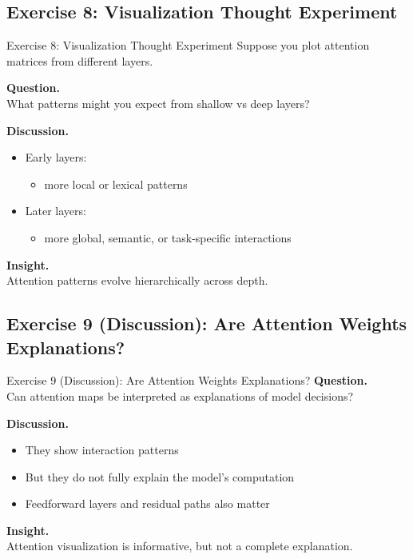 \documentclass[aspectratio=169,11pt]{beamer}
\begin{document}
\subsection{Exercise 8: Visualization Thought Experiment}
\begin{frame}[t,allowframebreaks]{Exercise 8: Visualization Thought Experiment}
\small
Suppose you plot attention matrices from different layers.

\textbf{Question.}\\ What patterns might you expect from shallow vs deep layers?

\textbf{Discussion.}\\ \begin{itemize}
    \item Early layers:
    \begin{itemize}
        \item more local or lexical patterns
    \end{itemize}

    \item Later layers:
    \begin{itemize}
        \item more global, semantic, or task-specific interactions
    \end{itemize}
\end{itemize}

\textbf{Insight.}\\ Attention patterns evolve hierarchically across depth.
\end{frame}

\subsection{Exercise 9 (Discussion): Are Attention Weights Explanations?}
\begin{frame}[t,allowframebreaks]{Exercise 9 (Discussion): Are Attention Weights Explanations?}
\small
\textbf{Question.}\\ Can attention maps be interpreted as explanations of model decisions?

\textbf{Discussion.}\\ \begin{itemize}
    \item They show interaction patterns
    \item But they do not fully explain the model’s computation
    \item Feedforward layers and residual paths also matter
\end{itemize}

\textbf{Insight.}\\ Attention visualization is informative, but not a complete explanation.
\end{frame}
\end{document}
